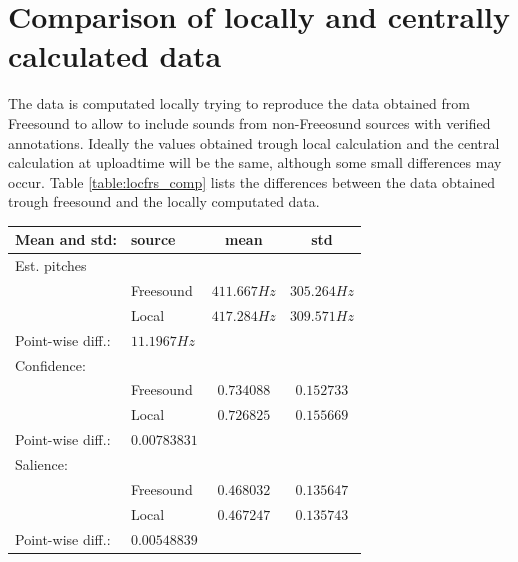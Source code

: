 \documentclass{proc}
\begin{document}
\section{Comparison of locally and centrally calculated data}
The data is computated locally trying to reproduce the data obtained from Freesound to allow to include sounds from non-Freeosund sources with verified annotations. Ideally the values obtained trough local calculation and the central calculation at uploadtime will be the same, although some small differences may occur. Table \ref{table:locfrs_comp} lists the differences between the data obtained trough freesound and the locally computated data.
\begin{table}[h]
    \begin{center}
        \begin{tabular}{ | l | l | c | c |}
            \hline
            Mean and std:           &   source      &   mean        &   std         \\  \hline  
            Est. pitches            &               &               &               \\  \hline
                                    &   Freesound   &   $411.667Hz$ &   $305.264Hz$ \\  \hline
                                    &   Local       &   $417.284Hz$ &   $309.571Hz$ \\  \hline
            Point-wise diff.:  &   $11.1967Hz$ &               &               \\  \hline
            Confidence:             &               &               &               \\  \hline
                                    &   Freesound   &   $0.734088$  &   $0.152733$  \\  \hline
                                    &   Local       &   $0.726825$  &   $0.155669$  \\  \hline
            Point-wise diff.:  &   $0.00783831$&               &               \\  \hline
            Salience:               &               &               &               \\  \hline
                                    &   Freesound   &   $0.468032$  &   $0.135647$  \\  \hline
                                    &   Local       &   $0.467247$  &   $0.135743$  \\  \hline
            Point-wise diff.:  &   $0.00548839$&               &               \\  \hline

\end{tabular}
\end{center}
\end{table}
\end{document}
